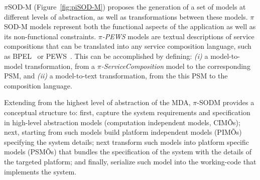 $\pi$SOD-M (Figure~\ref{fig:piSOD-M}) proposes the generation of a set of models at different levels of abstraction, as well as transformations between these models.
$\pi$SOD-M models represent both the functional aspects of the application as well as its non-functional constraints.
\textit{$\pi$-PEWS} models are textual descriptions of service compositions that can be translated into any service composition language, such as BPEL~\cite{bpel03} or PEWS~\cite{BaCAM05,Placido2010LTPD}.
This can be accomplished by defining: \textit{(i)} a model-to-model transformation, from a \textit{$\pi$-ServiceComposition} model to the corresponding PSM, and \textit{(ii)} a model-to-text transformation, from the this PSM to the composition language.

Extending from the highest level of abstraction of the MDA, $\pi$-SODM provides  a conceptual structure to: first, capture the system requirements and specification in high-level abstraction models (computation independent models, CIMÕs); next,  starting from such models build platform independent models (PIMÕs) specifying the system details; next transform such models into platform specific models (PSMÕs) that bundles the specification of the system with the details of the targeted platform; and finally, serialize such model into the working-code that implements the system. 


%



